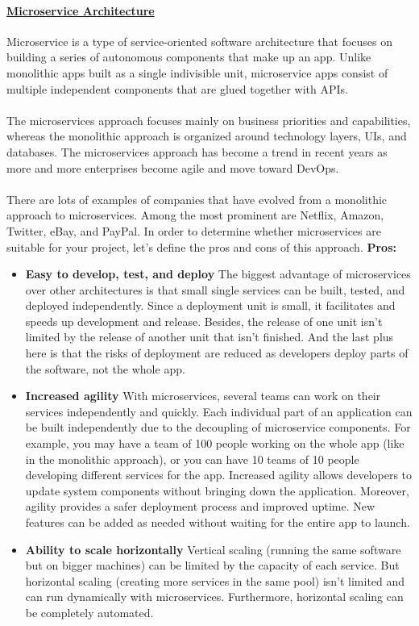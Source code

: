\documentclass[10pt,a4paper]{article}
\newcommand{\nline}{\\~\\}
\begin{document}
\paragraph{\uline{Microservice Architecture}} Microservice is a type of service-oriented software architecture that focuses on building a series of autonomous components that make up an app. Unlike monolithic apps built as a single indivisible unit, microservice apps consist of multiple independent components that are glued together with APIs. 
\nline
The microservices approach focuses mainly on business priorities and capabilities, whereas the monolithic approach is organized around technology layers, UIs, and databases. The microservices approach has become a trend in recent years as more and more enterprises become agile and move toward DevOps.
\nline
There are lots of examples of companies that have evolved from a monolithic approach to microservices. Among the most prominent are Netflix, Amazon, Twitter, eBay, and PayPal. In order to determine whether microservices are suitable for your project, let’s define the pros and cons of this approach.
\textbf{Pros:}
\begin{itemize}
		\item \textbf{Easy to develop, test, and deploy}
The biggest advantage of microservices over other architectures is that small single services can be built, tested, and deployed independently. Since a deployment unit is small, it facilitates and speeds up development and release. Besides, the release of one unit isn’t limited by the release of another unit that isn’t finished. And the last plus here is that the risks of deployment are reduced as developers deploy parts of the software, not the whole app.
	\item \textbf{Increased agility}
With microservices, several teams can work on their services independently and quickly. Each individual part of an application can be built independently due to the decoupling of microservice components. For example, you may have a team of 100 people working on the whole app (like in the monolithic approach), or you can have 10 teams of 10 people developing different services for the app. Increased agility allows developers to update system components without bringing down the application. Moreover, agility provides a safer deployment process and improved uptime. New features can be added as needed without waiting for the entire app to launch.
	\item \textbf{Ability to scale horizontally}
Vertical scaling (running the same software but on bigger machines) can be limited by the capacity of each service. But horizontal scaling (creating more services in the same pool) isn’t limited and can run dynamically with microservices. Furthermore, horizontal scaling can be completely automated.
\end{itemize}
\end{document}
